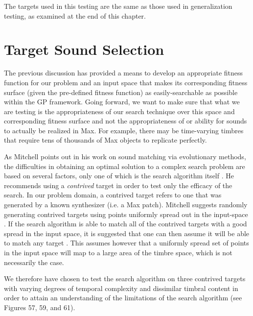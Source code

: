 \documentclass[12pt]{report} 	%
\numberwithin{figure}{chapter}
\numberwithin{table}{chapter}
\numberwithin{equation}{chapter}
\begin{document}
\begin{flushleft}
The targets used in this testing are the same as those used in generalization testing, as examined at the end of this chapter.

\vspace{12pt}\section{Target Sound Selection}

The previous discussion has provided a means to develop an appropriate fitness function for our problem and an input space that makes its corresponding fitness surface (given the pre-defined fitness function) as easily-searchable as possible within the GP framework. Going forward, we want to make sure that what we are testing is the appropriateness of our search technique over this space and corresponding fitness surface and not the appropriateness of or ability for sounds to actually be realized in Max. For example, there may be time-varying timbres that require tens of thousands of Max objects to replicate perfectly.

As Mitchell points out in his work on sound matching via evolutionary methods, the difficulties in obtaining an optimal solution to a complex search problem are based on several factors, only one of which is the search algorithm itself \cite[p. 1]{Mitchell:2007fe}. He recommends using a \textit{contrived} target in order to test only the efficacy of the search. In our problem domain, a contrived target refers to one that was generated by a known synthesizer (i.e. a Max patch). Mitchell suggests randomly generating contrived targets using points uniformly spread out in the input-space \cite[p. 2]{Mitchell:2007fe}. If the search algorithm is able to match all of the contrived targets with a good spread in the input space, it is suggested that one can then assume it will be able to match any target \cite[p. 2]{Mitchell:2007fe}. This assumes however that a uniformly spread set of points in the input space will map to a large area of the timbre space, which is not necessarily the case.

We therefore have chosen to test the search algorithm on three contrived targets with varying degrees of temporal complexity and dissimilar timbral content in order to attain an understanding of the limitations of the search algorithm (see Figures 57, 59, and 61). 


\end{flushleft}
\end{document}

